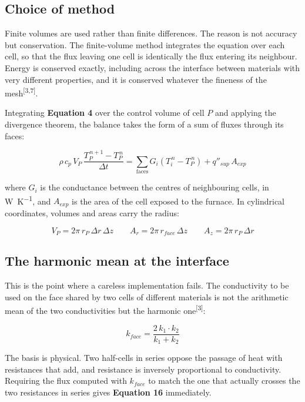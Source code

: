 \documentclass[11pt,a4paper]{article}
\newcommand{\cita}[1]{\textsuperscript{[\textcolor{uji}{#1}]}}
\newcommand{\ecu}[1]{\textbf{\textcolor{uji}{Equation #1}}}
\begin{document}
\subsection{Choice of method}

Finite volumes are used rather than finite differences. The reason is not
accuracy but conservation. The finite-volume method integrates the equation
over each cell, so that the flux leaving one cell is identically the flux
entering its neighbour. Energy is conserved exactly, including across the
interface between materials with very different properties, and it is
conserved whatever the fineness of the mesh\cita{3,7}.

Integrating \ecu{4} over the control volume of cell $P$ and applying the
divergence theorem, the balance takes the form of a sum of fluxes through
its faces:

\begin{equation}
\boxed{\;
\rho\, c_p\, V_{P}\, \frac{T_{P}^{\,n+1} - T_{P}^{\,n}}{\Delta t}
= \sum_{\text{faces}} G_{i} \left( T_{i}^{\,n} - T_{P}^{\,n} \right)
+ q''_{sup}\, A_{exp}
\;}
\end{equation}

where $G_{i}$ is the conductance between the centres of neighbouring cells,
in \si{\watt\per\kelvin}, and $A_{exp}$ is the area of the cell exposed to
the furnace. In cylindrical coordinates, volumes and areas carry the
radius:

\begin{equation}
V_{P} = 2\pi\, r_{P}\, \Delta r\, \Delta z
\qquad
A_{r} = 2\pi\, r_{face}\, \Delta z
\qquad
A_{z} = 2\pi\, r_{P}\, \Delta r
\end{equation}

\subsection{The harmonic mean at the interface}

This is the point where a careless implementation fails. The conductivity to
be used on the face shared by two cells of different materials is not the
arithmetic mean of the two conductivities but the harmonic one\cita{3}:

\begin{equation}
\boxed{\;
k_{face} = \frac{2\, k_{1} \cdot k_{2}}{k_{1} + k_{2}}
\;}
\end{equation}

The basis is physical. Two half-cells in series oppose the passage of heat
with resistances that add, and resistance is inversely proportional to
conductivity. Requiring the flux computed with $k_{face}$ to match the one
that actually crosses the two resistances in series gives \ecu{16}
immediately.
\end{document}
